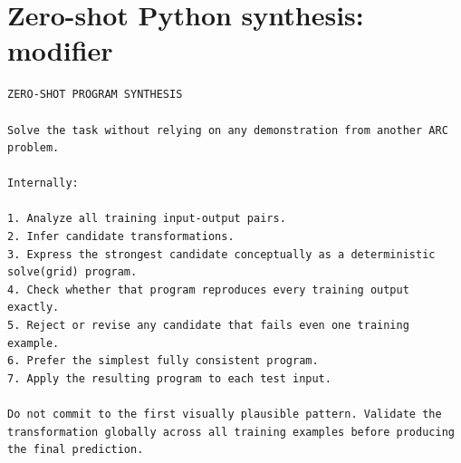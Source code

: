 \documentclass[a4paper,10pt]{article}
\begin{document}
\section*{Zero-shot Python synthesis: modifier}
\begin{Verbatim}[breaklines=true,breakanywhere=false,breaksymbolleft={},fontsize=\small]
ZERO-SHOT PROGRAM SYNTHESIS

Solve the task without relying on any demonstration from another ARC problem.

Internally:

1. Analyze all training input-output pairs.
2. Infer candidate transformations.
3. Express the strongest candidate conceptually as a deterministic solve(grid) program.
4. Check whether that program reproduces every training output exactly.
5. Reject or revise any candidate that fails even one training example.
6. Prefer the simplest fully consistent program.
7. Apply the resulting program to each test input.

Do not commit to the first visually plausible pattern. Validate the transformation globally across all training examples before producing the final prediction.
\end{Verbatim}
\end{document}
